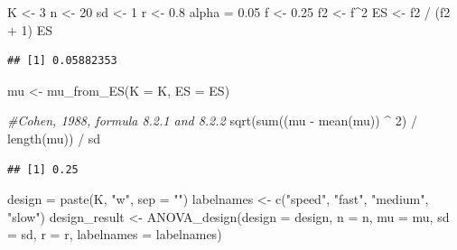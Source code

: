 \documentclass[
]{book}
\newenvironment{Shaded}{\begin{snugshade}}{\end{snugshade}}
\newcommand{\AttributeTok}[1]{\textcolor[rgb]{0.77,0.63,0.00}{#1}}
\newcommand{\CommentTok}[1]{\textcolor[rgb]{0.56,0.35,0.01}{\textit{#1}}}
\newcommand{\DecValTok}[1]{\textcolor[rgb]{0.00,0.00,0.81}{#1}}
\newcommand{\FloatTok}[1]{\textcolor[rgb]{0.00,0.00,0.81}{#1}}
\newcommand{\FunctionTok}[1]{\textcolor[rgb]{0.00,0.00,0.00}{#1}}
\newcommand{\NormalTok}[1]{#1}
\newcommand{\OtherTok}[1]{\textcolor[rgb]{0.56,0.35,0.01}{#1}}
\newcommand{\SpecialCharTok}[1]{\textcolor[rgb]{0.00,0.00,0.00}{#1}}
\newcommand{\StringTok}[1]{\textcolor[rgb]{0.31,0.60,0.02}{#1}}
\begin{document}
\begin{Shaded}
\begin{Highlighting}[]
\NormalTok{K }\OtherTok{\textless{}{-}} \DecValTok{3}
\NormalTok{n }\OtherTok{\textless{}{-}} \DecValTok{20}
\NormalTok{sd }\OtherTok{\textless{}{-}} \DecValTok{1}
\NormalTok{r }\OtherTok{\textless{}{-}} \FloatTok{0.8}
\NormalTok{alpha }\OtherTok{=} \FloatTok{0.05}
\NormalTok{f }\OtherTok{\textless{}{-}} \FloatTok{0.25}
\NormalTok{f2 }\OtherTok{\textless{}{-}}\NormalTok{ f}\SpecialCharTok{\^{}}\DecValTok{2}
\NormalTok{ES }\OtherTok{\textless{}{-}}\NormalTok{ f2 }\SpecialCharTok{/}\NormalTok{ (f2 }\SpecialCharTok{+} \DecValTok{1}\NormalTok{)}
\NormalTok{ES}
\end{Highlighting}
\end{Shaded}

\begin{verbatim}
## [1] 0.05882353
\end{verbatim}

\begin{Shaded}
\begin{Highlighting}[]
\NormalTok{mu }\OtherTok{\textless{}{-}} \FunctionTok{mu\_from\_ES}\NormalTok{(}\AttributeTok{K =}\NormalTok{ K, }\AttributeTok{ES =}\NormalTok{ ES)}

\CommentTok{\#Cohen, 1988, formula 8.2.1 and 8.2.2}
\FunctionTok{sqrt}\NormalTok{(}\FunctionTok{sum}\NormalTok{((mu }\SpecialCharTok{{-}} \FunctionTok{mean}\NormalTok{(mu)) }\SpecialCharTok{\^{}} \DecValTok{2}\NormalTok{) }\SpecialCharTok{/} \FunctionTok{length}\NormalTok{(mu)) }\SpecialCharTok{/}\NormalTok{ sd }
\end{Highlighting}
\end{Shaded}

\begin{verbatim}
## [1] 0.25
\end{verbatim}

\begin{Shaded}
\begin{Highlighting}[]
\NormalTok{design }\OtherTok{=} \FunctionTok{paste}\NormalTok{(K, }\StringTok{"w"}\NormalTok{, }\AttributeTok{sep =} \StringTok{""}\NormalTok{)}
\NormalTok{labelnames }\OtherTok{\textless{}{-}} \FunctionTok{c}\NormalTok{(}\StringTok{"speed"}\NormalTok{, }\StringTok{"fast"}\NormalTok{, }\StringTok{"medium"}\NormalTok{, }\StringTok{"slow"}\NormalTok{)}
\NormalTok{design\_result }\OtherTok{\textless{}{-}} \FunctionTok{ANOVA\_design}\NormalTok{(}\AttributeTok{design =}\NormalTok{ design,}
                   \AttributeTok{n =}\NormalTok{ n, }
                   \AttributeTok{mu =}\NormalTok{ mu, }
                   \AttributeTok{sd =}\NormalTok{ sd, }
                   \AttributeTok{r =}\NormalTok{ r, }
                   \AttributeTok{labelnames =}\NormalTok{ labelnames)}
\end{Highlighting}
\end{Shaded}
\end{document}

